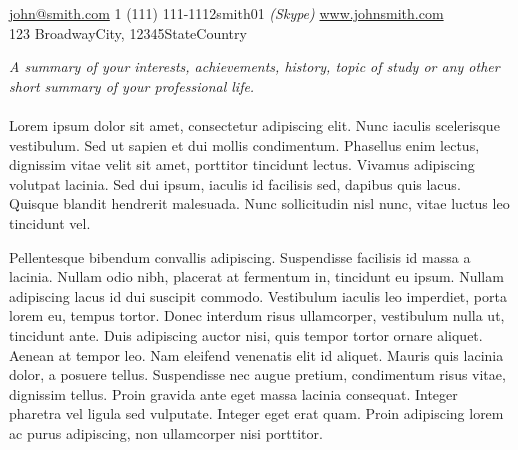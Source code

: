 \documentclass[10pt,a4paper]{article} %
\begin{document}


\noindent\href{mailto:john@smith.com}{john@smith.com}\bull %
\textsmaller{+}1 (111) 111-1112\bull smith01 \textit{(Skype)}\bull %
\href{http://www.johnsmith.com}{www.johnsmith.com}\\ %
123 Broadway\bull City, 12345\bull State\bull Country %

\spacedhrule{0.9em}{-0.4em} %



\vspace{-1.3em} %

\begin{multicols}{2}  %
\noindent \textit{A summary of your interests, achievements, history, topic of study or any other short summary of your professional life.}\\\\
Lorem ipsum dolor sit amet, consectetur adipiscing elit. Nunc iaculis scelerisque vestibulum. Sed ut sapien et dui mollis condimentum. Phasellus enim lectus, dignissim vitae velit sit amet, porttitor tincidunt lectus. Vivamus adipiscing volutpat lacinia. Sed dui ipsum, iaculis id facilisis sed, dapibus quis lacus. Quisque blandit hendrerit malesuada. Nunc sollicitudin nisl nunc, vitae luctus leo tincidunt vel.

Pellentesque bibendum convallis adipiscing. Suspendisse facilisis id massa a lacinia. Nullam odio nibh, placerat at fermentum in, tincidunt eu ipsum. Nullam adipiscing lacus id dui suscipit commodo. Vestibulum iaculis leo imperdiet, porta lorem eu, tempus tortor. Donec interdum risus ullamcorper, vestibulum nulla ut, tincidunt ante. Duis adipiscing auctor nisi, quis tempor tortor ornare aliquet. Aenean at tempor leo. Nam eleifend venenatis elit id aliquet. Mauris quis lacinia dolor, a posuere tellus. Suspendisse nec augue pretium, condimentum risus vitae, dignissim tellus. Proin gravida ante eget massa lacinia consequat. Integer pharetra vel ligula sed vulputate. Integer eget erat quam. Proin adipiscing lorem ac purus adipiscing, non ullamcorper nisi porttitor.
\end{multicols}
\end{document}
